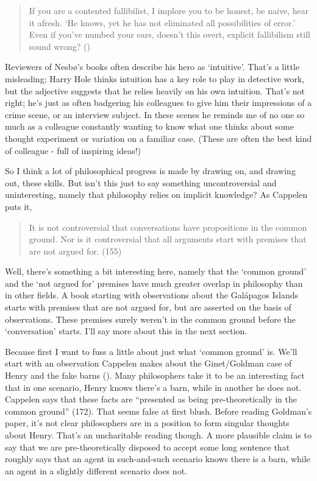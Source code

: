 \documentclass[
  10pt,
  letterpaper,
  DIV=11,
  numbers=noendperiod,
  twoside]{scrartcl}
\begin{document}
\begin{quote}
If you are a contented fallibilist, I implore you to be honest, be
naive, hear it afresh. `He knows, yet he has not eliminated all
possibilities of error.' Even if you've numbed your ears, doesn't this
overt, explicit fallibilism still sound wrong?
()
\end{quote}

Reviewers of Nesbø's books often describe his hero as `intuitive'.
That's a little misleading; Harry Hole thinks intuition has a key role
to play in detective work, but the adjective suggests that he relies
heavily on his own intuition. That's not right; he's just as often
badgering his colleagues to give him their impressions of a crime scene,
or an interview subject. In these scenes he reminds me of no one so much
as a colleague constantly wanting to know what one thinks about some
thought experiment or variation on a familiar case. (These are often the
best kind of colleague - full of inspiring ideas!)

So I think a lot of philosophical progress is made by drawing on, and
drawing out, these skills. But isn't this just to say something
uncontroversial and uninteresting, namely that philosophy relies on
implicit knowledge? As Cappelen puts it,

\begin{quote}
It is not controversial that conversations have propositions in the
common ground. Nor is it controversial that all arguments start with
premises that are not argued for. (155)
\end{quote}

Well, there's something a bit interesting here, namely that the `common
ground' and the `not argued for' premises have much greater overlap in
philosophy than in other fields. A book starting with observations about
the Galápagos Islands starts with premises that are not argued for, but
are asserted on the basis of observations. These premises surely weren't
in the common ground before the `conversation' starts. I'll say more
about this in the next section.

Because first I want to fuss a little about just what `common ground'
is. We'll start with an observation Cappelen makes about the
Ginet/Goldman case of Henry and the fake barns
(). Many philosophers take it to
be an interesting fact that in one scenario, Henry knows there's a barn,
while in another he does not. Cappelen says that these facts are
``presented as being pre-theoretically in the common ground'' (172).
That seems false at first blush. Before reading Goldman's paper, it's
not clear philosophers are in a position to form singular thoughts about
Henry. That's an uncharitable reading though. A more plausible claim is
to say that we are pre-theoretically disposed to accept some long
sentence that roughly says that an agent in such-and-such scenario knows
there is a barn, while an agent in a slightly different scenario does
not.
\end{document}
